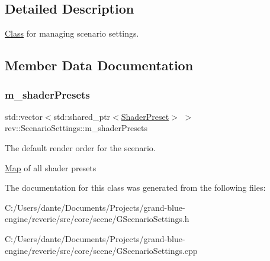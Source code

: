 \subsection{Detailed Description}
\mbox{\hyperlink{struct_class}{Class}} for managing scenario settings. 

\subsection{Member Data Documentation}
\mbox{\label{classrev_1_1_scenario_settings_a19886b9bd70d7a9fa470b90ef2d53ada}} 
\subsubsection{\texorpdfstring{m\_shaderPresets}{m\_shaderPresets}}
{\footnotesize\ttfamily std\+::vector$<$std\+::shared\+\_\+ptr$<$\mbox{\hyperlink{classrev_1_1_shader_preset}{Shader\+Preset}}$>$ $>$ rev\+::\+Scenario\+Settings\+::m\+\_\+shader\+Presets\hspace{0.3cm}{\ttfamily [protected]}}



The default render order for the scenario. 

\mbox{\hyperlink{classrev_1_1_map}{Map}} of all shader presets 

The documentation for this class was generated from the following files\+:\begin{DoxyCompactItemize}
\item 
C\+:/\+Users/dante/\+Documents/\+Projects/grand-\/blue-\/engine/reverie/src/core/scene/G\+Scenario\+Settings.\+h\item 
C\+:/\+Users/dante/\+Documents/\+Projects/grand-\/blue-\/engine/reverie/src/core/scene/G\+Scenario\+Settings.\+cpp\end{DoxyCompactItemize}

